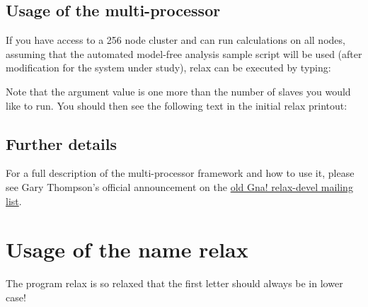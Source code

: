 
\subsection{Usage of the multi-processor}

If you have access to a 256 node cluster and can run calculations on all nodes, assuming that the  automated model-free analysis sample script will be used (after modification for the system under study), relax can be executed by typing:


Note that the argument  value is one more than the number of slaves you would like to run.
You should then see the following text in the initial relax printout:





\subsection{Further details}

For a full description of the multi-processor framework and how to use it, please see Gary Thompson's official announcement on the \href{http://www.nmr-relax.com/mail.gna.org/public/relax-devel/2007-05/msg00000.html}{old Gna! relax-devel mailing list}.




\section{Usage of the name relax}

The program relax is so relaxed that the first letter should always be in lower case!
